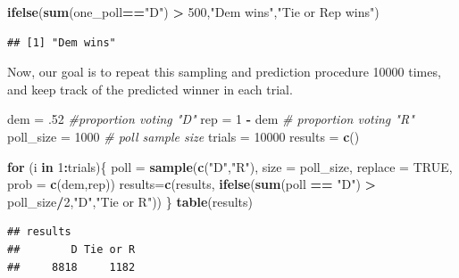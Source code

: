 \documentclass[
]{book}
\newenvironment{Shaded}{\begin{snugshade}}{\end{snugshade}}
\newcommand{\AttributeTok}[1]{\textcolor[rgb]{0.13,0.29,0.53}{#1}}
\newcommand{\CommentTok}[1]{\textcolor[rgb]{0.56,0.35,0.01}{\textit{#1}}}
\newcommand{\ConstantTok}[1]{\textcolor[rgb]{0.56,0.35,0.01}{#1}}
\newcommand{\ControlFlowTok}[1]{\textcolor[rgb]{0.13,0.29,0.53}{\textbf{#1}}}
\newcommand{\DecValTok}[1]{\textcolor[rgb]{0.00,0.00,0.81}{#1}}
\newcommand{\FunctionTok}[1]{\textcolor[rgb]{0.13,0.29,0.53}{\textbf{#1}}}
\newcommand{\NormalTok}[1]{#1}
\newcommand{\OtherTok}[1]{\textcolor[rgb]{0.56,0.35,0.01}{#1}}
\newcommand{\SpecialCharTok}[1]{\textcolor[rgb]{0.81,0.36,0.00}{\textbf{#1}}}
\newcommand{\StringTok}[1]{\textcolor[rgb]{0.31,0.60,0.02}{#1}}
\theoremstyle{definition}
\theoremstyle{definition}
\theoremstyle{definition}
\theoremstyle{definition}
\theoremstyle{remark}
\begin{document}
\begin{Shaded}
\begin{Highlighting}[]
\FunctionTok{ifelse}\NormalTok{(}\FunctionTok{sum}\NormalTok{(one\_poll}\SpecialCharTok{==}\StringTok{"D"}\NormalTok{) }\SpecialCharTok{\textgreater{}} \DecValTok{500}\NormalTok{,}\StringTok{"Dem wins"}\NormalTok{,}\StringTok{"Tie or Rep wins"}\NormalTok{)}
\end{Highlighting}
\end{Shaded}

\begin{verbatim}
## [1] "Dem wins"
\end{verbatim}

Now, our goal is to repeat this sampling and prediction procedure 10000 times, and keep track of the predicted winner in each trial.

\begin{Shaded}
\begin{Highlighting}[]
\NormalTok{dem }\OtherTok{=}\NormalTok{ .}\DecValTok{52} \CommentTok{\#proportion voting "D"}
\NormalTok{rep }\OtherTok{=} \DecValTok{1} \SpecialCharTok{{-}}\NormalTok{ dem }\CommentTok{\# proportion voting "R"}
\NormalTok{poll\_size }\OtherTok{=} \DecValTok{1000} \CommentTok{\# poll sample size}
\NormalTok{trials }\OtherTok{=} \DecValTok{10000}
\NormalTok{results }\OtherTok{=} \FunctionTok{c}\NormalTok{()}

\ControlFlowTok{for}\NormalTok{ (i }\ControlFlowTok{in} \DecValTok{1}\SpecialCharTok{:}\NormalTok{trials)\{}
\NormalTok{  poll }\OtherTok{=} \FunctionTok{sample}\NormalTok{(}\FunctionTok{c}\NormalTok{(}\StringTok{"D"}\NormalTok{,}\StringTok{"R"}\NormalTok{),}
                \AttributeTok{size =}\NormalTok{ poll\_size,}
                \AttributeTok{replace =} \ConstantTok{TRUE}\NormalTok{,}
                \AttributeTok{prob =} \FunctionTok{c}\NormalTok{(dem,rep))}
\NormalTok{  results}\OtherTok{=}\FunctionTok{c}\NormalTok{(results,}
            \FunctionTok{ifelse}\NormalTok{(}\FunctionTok{sum}\NormalTok{(poll }\SpecialCharTok{==} \StringTok{"D"}\NormalTok{) }\SpecialCharTok{\textgreater{}}\NormalTok{ poll\_size}\SpecialCharTok{/}\DecValTok{2}\NormalTok{,}\StringTok{"D"}\NormalTok{,}\StringTok{"Tie or R"}\NormalTok{))}
\NormalTok{\}}
\FunctionTok{table}\NormalTok{(results)}
\end{Highlighting}
\end{Shaded}

\begin{verbatim}
## results
##        D Tie or R 
##     8818     1182
\end{verbatim}
\end{document}
